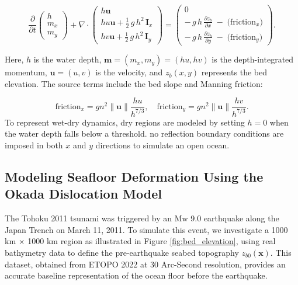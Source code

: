 \begin{equation}
\frac{\partial}{\partial t}
\begin{pmatrix}
h \\[3pt]
m_x \\[3pt]
m_y
\end{pmatrix}
+ \nabla \cdot
\begin{pmatrix}
h \mathbf{u} \\[5pt]
h u \mathbf{u} + \tfrac{1}{2}\,g\,h^2 \,\mathbf{I}_x \\[3pt]
h v \mathbf{u} + \tfrac{1}{2}\,g\,h^2 \,\mathbf{I}_y
\end{pmatrix}
=
\begin{pmatrix}
0 \\[4pt]
-\,g\,h\,\frac{\partial z_b}{\partial x} \;-\; \bigl(\text{friction}_x\bigr) \\[6pt]
-\,g\,h\,\frac{\partial z_b}{\partial y} \;-\; \bigl(\text{friction}_y\bigr)
\end{pmatrix}.
\end{equation}

Here, \( h \) is the water depth, \( \mathbf{m} = (m_x, m_y) = (h u, h v) \) is the depth-integrated momentum, \( \mathbf{u} = (u, v) \) is the velocity, and \( z_b(x, y) \) represents the bed elevation. The source terms include the bed slope and Manning friction:

\begin{equation}
\text{friction}_x = g n^2 \|\mathbf{u}\| \frac{h u}{h^{7/3}}, 
\quad
\text{friction}_y = g n^2 \|\mathbf{u}\| \frac{h v}{h^{7/3}}.
\end{equation}
To represent wet-dry dynamics, dry regions are modeled by setting \( h = 0 \) when the water depth falls below a threshold. no reflection boundary conditions are imposed in both \( x \) and \( y \) directions to simulate an open ocean. 

\subsection*{Modeling Seafloor Deformation Using the Okada Dislocation Model}
The Tohoku 2011 tsunami was triggered by an Mw 9.0 earthquake along the Japan Trench on March 11, 2011. To simulate this event, we investigate a 1000 km × 1000 km region as illustrated in Figure \ref{fig:bed_elevation}, using real bathymetry data to define the pre-earthquake seabed topography \( z_{b0}(\textbf{x}) \). This dataset, obtained from ETOPO 2022 at 30 Arc-Second resolution, provides an accurate baseline representation of the ocean floor before the earthquake.


